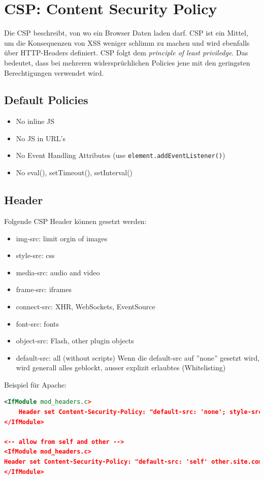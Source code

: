 \section{CSP: Content Security Policy}
Die CSP beschreibt, von wo ein Browser Daten laden darf. CSP ist ein Mittel, um die Konsequenzen von XSS weniger schlimm zu machen und wird ebenfalls über HTTP-Headers definiert. CSP folgt dem \emph{principle of least priviledge}. Das bedeutet, dass bei mehreren widersprüchlichen Policies jene mit den geringsten Berechtigungen verwendet wird.

\subsection{Default Policies}
\begin{itemize}
	\item No inline JS
	\item No JS in URL's
	\item No Event Handling Attributes (use \lstinline|element.addEventListener()|)
	\item No eval(), setTimeout(), setInterval()
\end{itemize}

\subsection{Header}
Folgende CSP Header können gesetzt werden: 
\begin{itemize}
	\item img-src: limit orgin of images
	\item style-src: css
	\item media-src: audio and video
	\item frame-src: iframes
	\item connect-src: XHR, WebSockets, EventSource
	\item font-src: fonts
	\item object-src: Flash, other plugin objects
	\item default-src: all (without scripts) Wenn die default-src auf ''none'' gesetzt wird, wird generall alles geblockt, ausser explizit erlaubtes (Whitelisting)
\end{itemize}

Beispiel für Apache:
\begin{lstlisting}[language=XML]
<IfModule mod_headers.c>
	Header set Content-Security-Policy: "default-src: 'none'; style-src: 'self'; img-src: 'self' "
</IfModule>

<-- allow from self and other -->
<IfModule mod_headers.c>
Header set Content-Security-Policy: "default-src: 'self' other.site.com; "
</IfModule>
\end{lstlisting}

